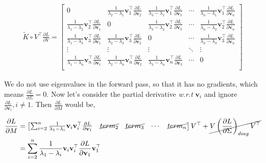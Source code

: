 \documentclass{article}
\newcommand{\bv}{\mathbf{v}}
\begin{document}
	\begin{equation}
	\begin{aligned}
	\tilde{K}\circ V^{\top}\frac{\partial L}{\partial V} = 
	\begin{bmatrix}
	0& \frac{1}{\lambda_{2} - \lambda_{1}}\bv_{1}^{\top}\frac{\partial L}{\partial \bv_{2}}  
	&\frac{1}{\lambda_{3} - \lambda_{1}}\bv_{1}^{\top}\frac{\partial L}{\partial \bv_{3}}  
	&\cdots &\frac{1}{\lambda_{n} - \lambda_{1}}\bv_{1}^{\top}\frac{\partial L}{\partial \bv_{n}} \\
	\frac{1}{\lambda_{1} - \lambda_{2}}\bv_{2}^{\top}\frac{\partial L}{\partial \bv_{1}} &0  
	&\frac{1}{\lambda_{3} - \lambda_{2}}\bv_{2}^{\top}\frac{\partial L}{\partial \bv_{3}}  &\cdots 
	&\frac{1}{\lambda_{n} - \lambda_{2}}\bv_{2}^{\top}\frac{\partial L}{\partial \bv_{n}} \\
	\frac{1}{\lambda_{1} - \lambda_{3}}\bv_{3}^{\top}\frac{\partial L}{\partial \bv_{1}} 
	&\frac{1}{\lambda_{2} - \lambda_{3}}\bv_{3}^{\top}\frac{\partial L}{\partial \bv_{2}}  &0  &\cdots 
	&\frac{1}{\lambda_{n} - \lambda_{3}}\bv_{3}^{\top}\frac{\partial L}{\partial \bv_{n}} \\
	\vdots &\vdots &\vdots &\ddots &\vdots\\
	\frac{1}{\lambda_{1} - \lambda_{n}}\bv_{n}^{\top}\frac{\partial L}{\partial \bv_{1}} 
	&\frac{1}{\lambda_{2} - \lambda_{n}}\bv_{n}^{\top}\frac{\partial L}{\partial \bv_{2}} 
	 &\frac{1}{\lambda_{3} - \lambda_{n}}\bv_{n}^{\top}\frac{\partial L}{\partial \bv_{3}}  &\cdots &0 \\
	\end{bmatrix}
	\end{aligned}
	\end{equation}
	
	We do not use eigenvalues in the forward pass, so that it has no gradients, which means $\frac{\partial L}{\partial \Sigma}=0$.
	Now let's consider the partial derivative \emph{w.r.t} $\bv_{i}$ and ignore $\frac{\partial L}{\partial \bv_{i}}, i \neq 1$.
	Then $\frac{\partial L}{\partial M}$ would be,
	
	\begin{equation}
	\begin{aligned}
	\frac{\partial L}{\partial M}&=
	\begin{bmatrix}
	\sum_{i=2}^{n}\frac{1}{\lambda_{1}-\lambda_{i}}\bv_{i}\bv_{i}^{\top}\frac{\partial L}{\partial \bv_{1}}
	&\cancel{term_2} &\cancel{term_3} &\cdots &\cancel{term_n}
	\end{bmatrix}V^{\top}
	+ \cancel{V\left(\frac{\partial L}{\partial \Sigma}\right)_{d i a g} V^{\top}}\\
	&=\sum_{i=2}^{n}\frac{1}{\lambda_{1}-\lambda_{i}}\bv_{i}\bv_{i}^{\top}\frac{\partial L}{\partial \bv_{1}}\bv_{1}^{\top}
	\end{aligned}
	\end{equation}
\end{document}
